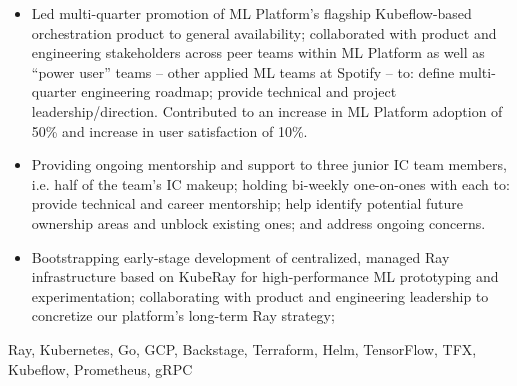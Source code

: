 \documentclass[alternative,10pt,compact]{yaac-another-awesome-cv}
\begin{document}
\begin{experiences}
{\begin{itemize}
        \item Led multi-quarter promotion of ML Platform's flagship
          Kubeflow-based orchestration product to general availability;
          collaborated with product and engineering stakeholders across peer
          teams within ML Platform as well as ``power user'' teams -- other
          applied ML teams at Spotify -- to: define multi-quarter engineering
          roadmap; provide technical and project
          leadership/direction. Contributed to an increase in ML Platform
          adoption of 50\% and increase in user satisfaction of 10\%.

        \item Providing ongoing mentorship and support to three junior IC team
          members, i.e. half of the team's IC makeup; holding bi-weekly
          one-on-ones with each to: provide technical and career mentorship;
          help identify potential future ownership areas and unblock existing
          ones; and address ongoing concerns.


      \item Bootstrapping early-stage development of centralized, managed Ray
        infrastructure based on KubeRay for high-performance ML prototyping and
        experimentation; collaborating with product and engineering leadership
        to concretize our platform's long-term Ray strategy;
      \end{itemize}
    }
    {Ray, Kubernetes, Go, GCP, Backstage, Terraform, Helm, TensorFlow, TFX, Kubeflow, Prometheus, gRPC}

\emptySeparator


\end{experiences}
\end{document}
